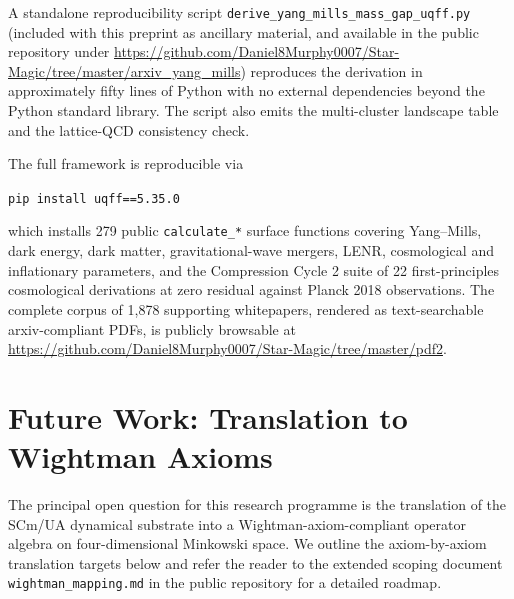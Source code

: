 \documentclass[11pt,a4paper,onecolumn]{article}
\theoremstyle{plain}
\theoremstyle{definition}
\theoremstyle{remark}
\begin{document}
\noindent
A standalone reproducibility script
\texttt{derive\_yang\_mills\_mass\_gap\_uqff.py} (included with this
preprint as ancillary material, and available in the public
repository under
\url{https://github.com/Daniel8Murphy0007/Star-Magic/tree/master/arxiv_yang_mills})
reproduces the derivation in approximately fifty lines of Python with
no external dependencies beyond the Python standard library. The
script also emits the multi-cluster landscape table and the
lattice-QCD consistency check.

The full framework is reproducible via
\begin{center}
\verb|pip install uqff==5.35.0|
\end{center}
which installs 279 public \texttt{calculate\_*} surface functions
covering Yang--Mills, dark energy, dark matter, gravitational-wave
mergers, LENR, cosmological and inflationary parameters, and the
Compression Cycle 2 suite of 22 first-principles cosmological
derivations at zero residual against Planck 2018 observations.
The complete corpus of 1{,}878 supporting whitepapers, rendered as
text-searchable arxiv-compliant PDFs, is publicly browsable at
\url{https://github.com/Daniel8Murphy0007/Star-Magic/tree/master/pdf2}.

\section{Future Work: Translation to Wightman Axioms}\label{sec:future}

The principal open question for this research programme is the
translation of the SCm/UA dynamical substrate into a
Wightman-axiom-compliant operator algebra on four-dimensional
Minkowski space. We outline the axiom-by-axiom translation targets
below and refer the reader to the extended scoping document
\texttt{wightman\_mapping.md} in the public repository for a
detailed roadmap.
\end{document}

